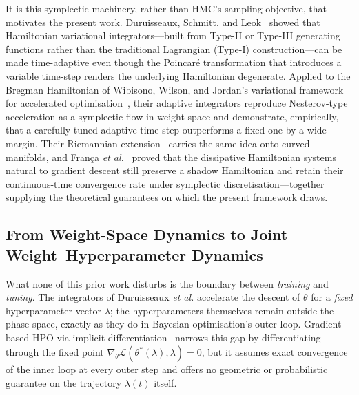 \documentclass[11pt]{article}
\theoremstyle{definition}
\newcommand{\calL}{\mathcal{L}}
\begin{document}
It is this symplectic machinery, rather than HMC's sampling
objective, that motivates the present work. Duruisseaux, Schmitt, and
Leok~\cite{duruisseaux2021adaptive} showed that Hamiltonian
variational integrators---built from Type-II or Type-III generating
functions rather than the traditional Lagrangian (Type-I)
construction---can be made time-adaptive even though the Poincar\'e
transformation that introduces a variable time-step renders the
underlying Hamiltonian degenerate. Applied to the Bregman Hamiltonian
of Wibisono, Wilson, and Jordan's variational framework for
accelerated optimisation~\cite{wibisono2016}, their adaptive
integrators reproduce Nesterov-type acceleration as a symplectic flow
in weight space and demonstrate, empirically, that a carefully tuned
adaptive time-step outperforms a fixed one by a wide margin. Their
Riemannian extension~\cite{duruisseaux2022variational} carries the
same idea onto curved manifolds, and Fran\c{c}a \emph{et
al.}~\cite{franca2021dissipative} proved that the dissipative
Hamiltonian systems natural to gradient descent still preserve a
shadow Hamiltonian and retain their continuous-time convergence rate
under symplectic discretisation---together supplying the theoretical
guarantees on which the present framework draws.

\subsection{From Weight-Space Dynamics to Joint Weight--Hyperparameter Dynamics}

What none of this prior work disturbs is the boundary between
\emph{training} and \emph{tuning}. The integrators of
Duruisseaux \emph{et al.} accelerate the descent of $\theta$ for a
\emph{fixed} hyperparameter vector $\lambda$; the hyperparameters
themselves remain outside the phase space, exactly as they do in
Bayesian optimisation's outer loop. Gradient-based HPO via implicit
differentiation~\cite{lorraine2020millions,franceschi2018bilevel,blondel2021implicit}
narrows this gap by differentiating through the fixed point
$\nabla_\theta\calL(\theta^*(\lambda),\lambda)=0$, but it assumes
exact convergence of the inner loop at every outer step and offers no
geometric or probabilistic guarantee on the trajectory $\lambda(t)$
itself.
\end{document}
